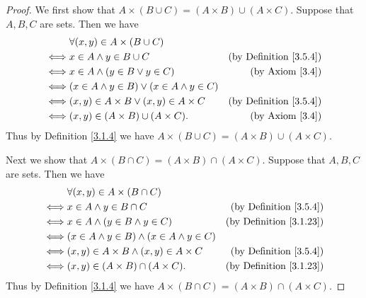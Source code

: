 \begin{proof}
    We first show that \(A \times (B \cup C) = (A \times B) \cup (A \times C)\).
    Suppose that \(A, B, C\) are sets.
    Then we have
    \begin{align*}
             & \forall (x, y) \in A \times (B \cup C)                                                    \\
        \iff & x \in A \land y \in B \cup C                         & \text{(by Definition \ref{3.5.4})} \\
        \iff & x \in A \land (y \in B \lor y \in C)                 & \text{(by Axiom \ref{3.4})}        \\
        \iff & (x \in A \land y \in B) \lor (x \in A \land y \in C)                                      \\
        \iff & (x, y) \in A \times B \lor (x, y) \in A \times C     & \text{(by Definition \ref{3.5.4})} \\
        \iff & (x, y) \in (A \times B) \cup (A \times C).           & \text{(by Axiom \ref{3.4})}
    \end{align*}
    Thus by Definition \ref{3.1.4} we have \(A \times (B \cup C) = (A \times B) \cup (A \times C)\).

    Next we show that \(A \times (B \cap C) = (A \times B) \cap (A \times C)\).
    Suppose that \(A, B, C\) are sets.
    Then we have
    \begin{align*}
             & \forall (x, y) \in A \times (B \cap C)                                                      \\
        \iff & x \in A \land y \in B \cap C                          & \text{(by Definition \ref{3.5.4})}  \\
        \iff & x \in A \land (y \in B \land y \in C)                 & \text{(by Definition \ref{3.1.23})} \\
        \iff & (x \in A \land y \in B) \land (x \in A \land y \in C)                                       \\
        \iff & (x, y) \in A \times B \land (x, y) \in A \times C     & \text{(by Definition \ref{3.5.4})}  \\
        \iff & (x, y) \in (A \times B) \cap (A \times C).            & \text{(by Definition \ref{3.1.23})}
    \end{align*}
    Thus by Definition \ref{3.1.4} we have \(A \times (B \cap C) = (A \times B) \cap (A \times C)\).


\end{proof}
